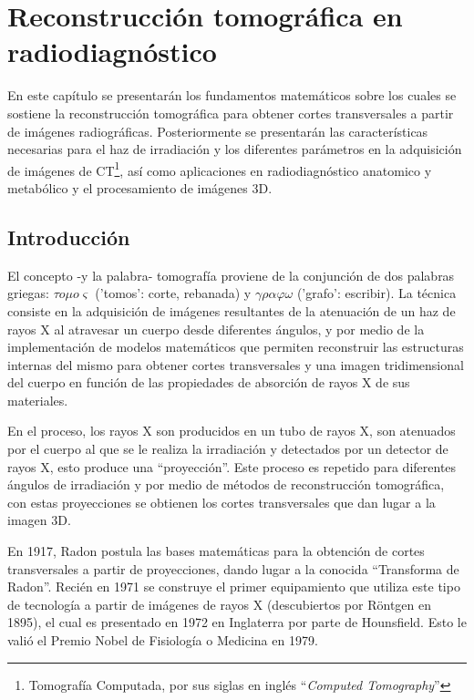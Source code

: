 \chapter{Reconstrucci\'on tomogr\'afica en radiodiagn\'ostico}

En este capítulo se presentarán los fundamentos matemáticos sobre los cuales se sostiene la reconstrucción tomográfica para obtener cortes transversales a partir de imágenes radiográficas. Posteriormente se presentarán las características necesarias para el haz de irradiación y los diferentes parámetros en la adquisición de imágenes de CT\footnote{Tomografía Computada, por sus siglas en inglés ``\emph{Computed Tomography}''}, así como aplicaciones en radiodiagnóstico anatomico y metabólico y el procesamiento de imágenes 3D.

\section{Introducci\'on}

El concepto -y la palabra- tomografía proviene de la conjunción de dos palabras griegas: $\tau o \mu o \varsigma$ ('tomos': corte, rebanada) y $\gamma \rho \alpha \varphi \omega$ ('grafo': escribir). La técnica consiste en la adquisición de imágenes resultantes de la atenuación de un haz de rayos X al atravesar un cuerpo desde diferentes ángulos, y por medio de la implementación de modelos matemáticos que permiten reconstruir las estructuras internas del mismo para obtener cortes transversales y una imagen tridimensional del cuerpo en función de las propiedades de absorción de rayos X de sus materiales.

En el proceso, los rayos X son producidos en un tubo de rayos X, son atenuados por el cuerpo al que se le realiza la irradiación y detectados por un detector de rayos X, esto produce una ``proyección''. Este proceso es repetido para diferentes ángulos de irradiación y por medio de métodos de reconstrucción tomográfica, con estas proyecciones se obtienen los cortes transversales que dan lugar a la imagen 3D.

En 1917, Radon postula las bases matemáticas para la obtención de cortes transversales a partir de proyecciones, dando lugar a la conocida ``Transforma de Radon''. Recién en 1971 se construye el primer equipamiento que utiliza este tipo de tecnología a partir de imágenes de rayos X (descubiertos por Röntgen en 1895), el cual es presentado en 1972 en Inglaterra por parte de Hounsfield. Esto le valió el Premio Nobel de Fisiología o Medicina en 1979.


